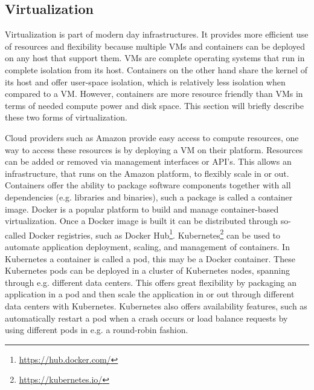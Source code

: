 \subsection{Virtualization}
Virtualization is part of modern day infrastructures. It provides more efficient use of resources and flexibility because multiple VMs and containers can be deployed on any host that support them. VMs are complete operating systems that run in complete isolation from its host. Containers on the other hand share the kernel of its host and offer user-space isolation, which is relatively less isolation when compared to a VM. However, containers are more resource friendly than VMs in terms of needed compute power and disk space. This section will briefly describe these two forms of virtualization.

Cloud providers such as Amazon provide easy access to compute resources, one way to access these resources is by deploying a VM on their platform. Resources can be added or removed via management interfaces or API's. This allows an infrastructure, that runs on the Amazon platform, to flexibly scale in or out. Containers offer the ability to package software components together with all dependencies (e.g. libraries and binaries), such a package is called a container image. Docker is a popular platform to build and manage container-based virtualization. Once a Docker image is built it can be distributed through so-called Docker registries, such as Docker Hub\footnote{\url{https://hub.docker.com/}}. Kubernetes\footnote{\url{https://kubernetes.io/}} can be used to automate application deployment, scaling, and management of containers. In Kubernetes a container is called a pod, this may be a Docker container. These Kubernetes pods can be deployed in a cluster of Kubernetes nodes, spanning through e.g. different data centers. This offers great flexibility by packaging an application in a pod and then scale the application in or out through different data centers with Kubernetes. Kubernetes also offers availability features, such as automatically restart a pod when a crash occurs or load balance requests by using different pods in e.g. a round-robin fashion.


